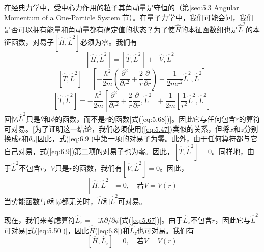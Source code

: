     在经典力学中，受中心力作用的粒子其角动量是守恒的（第\ref{sec:5.3 Angular Momentum of a One-Particle System}节）。在量子力学中，我们可能会问，我们是否可以拥有能量和角动量都有确定值的状态？为了使$\hat{H}$的本征函数组也是$\hat{L}^2$的本征函数，对易子$\left[\hat{H},\hat{L}^2\right]$必须为零。我们有
    \begin{equation*}
        \left[\hat{H},\hat{L}^2\right] = \left[\hat{T},\hat{L}^2\right] + \left[\hat{V},\hat{L}^2\right]
    \end{equation*}
    \begin{equation*}
        \left[\hat{T}, \hat{L}^2\right] = \left[-\frac{\hbar^2}{2m}\left(\frac{\partial ^2}{\partial r^2} + \frac{2}{r}\frac{\partial}{\partial r}\right) + \frac{1}{2mr^2}\hat{L}^2, \hat{L}^2\right]
    \end{equation*}
    \begin{equation}
        \left[\hat{T},\hat{L}^2\right] = -\frac{\hbar^2}{2m}\left[\frac{\partial^2}{\partial r^2} + \frac{2}{r}\frac{\partial}{\partial r}, \hat{L}^2\right] + \frac{1}{2m}\left[\frac{1}{r^2}\hat{L}^2, \hat{L}^2\right]
        \label{eq:6.9}
    \end{equation}
    回忆$\hat{L}^2$只是$\theta$和$\phi$的函数，而不是$r$的函数[式(\ref{eq:5.68})]。因此它与任何包含$r$的算符可对易。[为了证明这一结论，我们必须使用(\ref{eq:5.47})类似的关系，但将$x$和$z$分别换成$r$和$\theta$。]因此，式(\ref{eq:6.9})中第一项的对易子为零。此外，由于任何算符都与它自己对易，式(\ref{eq:6.9})第二项的对易子也为零。因此，$\left[\hat{T},\hat{L}^2\right] = 0$。同样地，由于$\hat{L}^2$不包含$r$，$V$只是$r$的函数，我们有$\left[\hat{V},\hat{L}^2\right] = 0$。因此，
    \begin{equation}
        \left[\hat{H},\hat{L}^2\right] = 0, \quad \text{若} V = V\left(r\right)
        \label{eq:6.10}
    \end{equation}
    当势能函数与$\theta$和$\phi$都无关时，$\hat{H}$和$\hat{L}^2$可对易。

    现在，我们来考虑算符$\hat{L}_z = -\mathrm{i}\hbar\partial/\partial\phi$[式(\ref{eq:5.67})]。由于$\hat{L}_z$不包含$r$，因此它与$\hat{L}^2$可对易[式(\ref{eq:5.50})]，因此$\hat{H}$(\ref{eq:6.8})和$\hat{L}_z$也可对易。我们有
    \begin{equation}
        \left[\hat{H}, \hat{L}_z\right] = 0, \quad \text{若} V = V\left(r\right)
        \label{eq:6.11}
    \end{equation}

